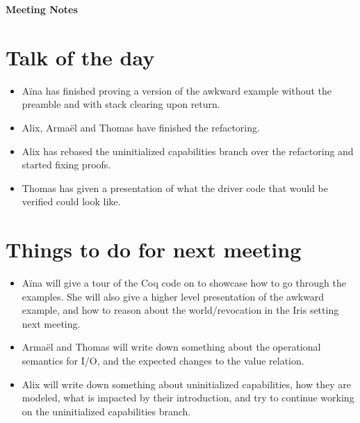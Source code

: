 \documentclass[a4paper, 10pt]{article}
\begin{document}
\lhead{}
\rhead{}
\renewcommand{\headrulewidth}{0pt}
\renewcommand{\footrulewidth}{0pt}


\begin{center}
{\LARGE \bf Meeting Notes}\\
\end{center}

\section{Talk of the day}

\begin{itemize}
\item A\"ina has finished proving a version of the awkward example without the preamble and with stack clearing upon return.

\item Alix, Arma\"el and Thomas have finished the refactoring.

\item Alix has rebased the uninitialized capabilities branch over the refactoring and started fixing proofs.

\item Thomas has given a presentation of what the driver code that would be verified could look like.
\end{itemize}

\section{Things to do for next meeting}

\begin{itemize}
\item A\"ina will give a tour of the Coq code on  to showcase how to go through the examples. She will also give a higher level presentation of the awkward example, and how to reason about the world/revocation in the Iris setting next meeting.

\item Arma\"el and Thomas will write down something about the operational semantics for I/O, and the expected changes to the value relation.

\item Alix will write down something about uninitialized capabilities, how they are modeled, what is impacted by their introduction, and try to continue working on the uninitialized capabilities branch.
\end{itemize}
\end{document}
